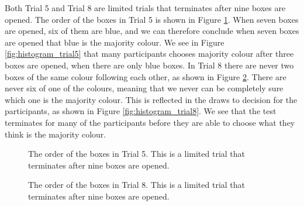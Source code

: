 Both Trial 5 and Trial 8 are limited trials that terminates after nine boxes are opened. The order of the boxes in Trial 5 is shown in Figure \ref{fig:trial5_order}. When seven boxes are opened, six of them are blue, and we can therefore conclude when seven boxes are opened that blue is the majority colour. We see in Figure \ref{fig:histogram_trial5} that many participants chooses majority colour after three boxes are opened, when there are only blue boxes. In Trial 8 there are never two boxes of the same colour following each other, as shown in Figure \ref{fig:trial8_order}. There are never six of one of the colours, meaning that we never can be completely sure which one is the majority colour. This is reflected in the draws to decision for the participants, as shown in Figure \ref{fig:histogram_trial8}. We see that the test terminates for many of the participants before they are able to choose what they think is the majority colour. 
\begin{figure}
    \centering
    \scalebox{0.8}{}
    \caption[Order of Boxes in Trial 5]{The order of the boxes in Trial 5. This is a limited trial that terminates after nine boxes are opened.}
    \label{fig:trial5_order}
\end{figure}
\begin{figure}
    \centering
    \scalebox{0.8}{}
    \caption[Order of Boxes in Trial 8]{The order of the boxes in Trial 8. This is a limited trial that terminates after nine boxes are opened.}
    \label{fig:trial8_order}
\end{figure}
